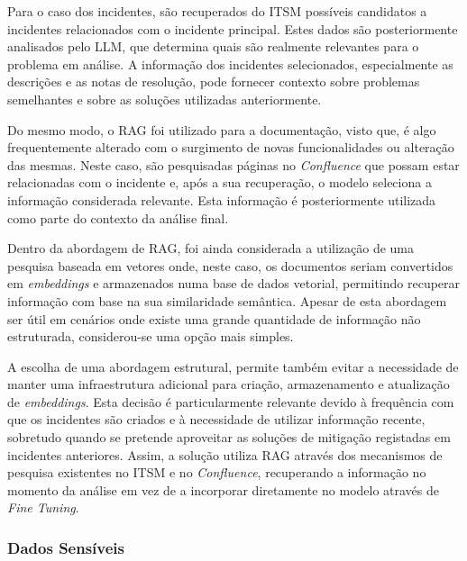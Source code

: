 			Para o caso dos incidentes, são recuperados do \gls{ITSM} possíveis candidatos a incidentes relacionados com o incidente principal. Estes dados são posteriormente analisados pelo \gls{LLM}, que determina quais são realmente relevantes para o problema em análise. A informação dos incidentes selecionados, especialmente as descrições e as notas de resolução, pode fornecer contexto sobre problemas semelhantes e sobre as soluções utilizadas anteriormente.
			
			Do mesmo modo, o \gls{RAG} foi utilizado para a documentação, visto que, é algo frequentemente alterado com o surgimento de novas funcionalidades ou alteração das mesmas. Neste caso, são pesquisadas páginas no \textit{Confluence} que possam estar relacionadas com o incidente e, após a sua recuperação, o modelo seleciona a informação considerada relevante. Esta informação é posteriormente utilizada como parte do contexto da análise final.
			
			Dentro da abordagem de \gls{RAG}, foi ainda considerada a utilização de uma pesquisa baseada em vetores onde, neste caso, os documentos seriam convertidos em \textit{embeddings} e armazenados numa base de dados vetorial, permitindo recuperar informação com base na sua similaridade semântica. Apesar de esta abordagem ser útil em cenários onde existe uma grande quantidade de informação não estruturada, considerou-se uma opção mais simples. 	
			
			A escolha de uma abordagem estrutural, permite também evitar a necessidade de manter uma infraestrutura adicional para criação, armazenamento e atualização de \textit{embeddings}. Esta decisão é particularmente relevante devido à frequência com que os incidentes são criados e à necessidade de utilizar informação recente, sobretudo quando se pretende aproveitar as soluções de mitigação registadas em incidentes anteriores. Assim, a solução utiliza \gls{RAG} através dos mecanismos de pesquisa existentes no \gls{ITSM} e no \textit{Confluence}, recuperando a informação no momento da análise em vez de a incorporar diretamente no modelo através de \textit{Fine Tuning}.
		
		\subsubsection{Dados Sensíveis}
			
